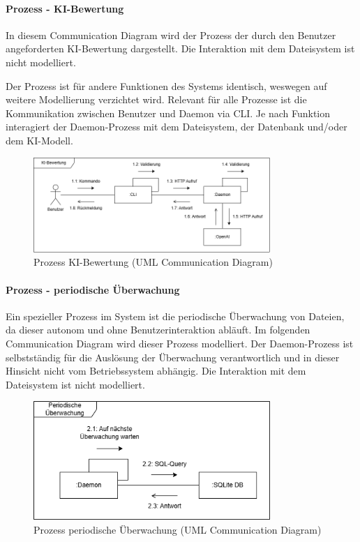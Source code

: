 \documentclass[a4paper,12pt]{report}
\begin{document}
    \paragraph*{Prozess - KI-Bewertung}
    In diesem Communication Diagram wird der Prozess der durch den Benutzer angeforderten KI-Bewertung dargestellt.
    Die Interaktion mit dem Dateisystem ist nicht modelliert.

    Der Prozess ist für andere Funktionen des Systems identisch, weswegen auf weitere Modellierung verzichtet wird.
    Relevant für alle Prozesse ist die Kommunikation zwischen Benutzer und Daemon via CLI\@.
    Je nach Funktion interagiert der Daemon-Prozess mit dem Dateisystem, der Datenbank und/oder dem KI-Modell.

    \begin{figure}[h]
        \centering
        \includegraphics[width=0.8\textwidth]{assets/communication}
        \caption{Prozess KI-Bewertung (UML Communication Diagram)}
        \label{fig:communication}
    \end{figure}
    \clearpage

    \paragraph*{Prozess - periodische Überwachung}
    Ein spezieller Prozess im System ist die periodische Überwachung von Dateien, da dieser autonom und ohne Benutzerinteraktion abläuft.
    Im folgenden Communication Diagram wird dieser Prozess modelliert.
    Der Daemon-Prozess ist selbstständig für die Auslösung der Überwachung verantwortlich und in dieser Hinsicht nicht vom Betriebssystem abhängig.
    Die Interaktion mit dem Dateisystem ist nicht modelliert.

    \begin{figure}[h]
        \centering
        \includegraphics[width=0.8\textwidth]{assets/communication-scheduler}
        \caption{Prozess periodische Überwachung (UML Communication Diagram)}
        \label{fig:communication-scheduler}
    \end{figure}
\end{document}
